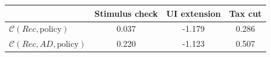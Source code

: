 \begin{tabular}{@{}lccc@{}} 
\toprule 
                          & Stimulus check      & UI extension    & Tax cut    \\  \midrule 
$\mathcal{C}(Rec,\text{policy})$ & 0.037  & -1.179  & 0.286     \\ 
$\mathcal{C}(Rec, AD,\text{policy})$ & 0.220  & -1.123  & 0.507     \\ 
\end{tabular}  
